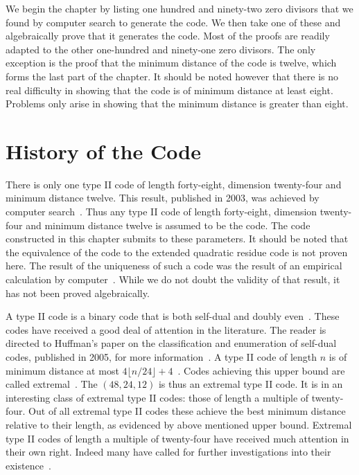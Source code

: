 We begin the chapter by listing one hundred and ninety-two zero divisors that we found by computer search to generate the code.
We then take one of these and algebraically prove that it generates the code.
Most of the proofs are readily adapted to the other one-hundred and ninety-one zero divisors.
The only exception is the proof that the minimum distance of the code is twelve, which forms the last part of the chapter.
It should be noted however that there is no real difficulty in showing that the code is of minimum distance at least eight.
Problems only arise in showing that the minimum distance is greater than eight.

\section{History of the Code}
There is only one type II code of length forty-eight, dimension twenty-four and minimum distance twelve.
This result, published in 2003, was achieved by computer search~\cite{hou02}.
Thus any type II code of length forty-eight, dimension twenty-four and minimum distance twelve is assumed to be the code.
The code constructed in this chapter submits to these parameters.
It should be noted that the equivalence of the code to the extended quadratic residue code is not proven here.
The result of the uniqueness of such a code was the result of an empirical calculation by computer~\cite{hou02}.
While we do not doubt the validity of that result, it has not been proved algebraically.

A type II code is a binary code that is both self-dual and doubly even~\cite[p.~339]{huf03}.
These codes have received a good deal of attention in the literature.
The reader is directed to Huffman's paper on the classification and enumeration of self-dual codes, published in 2005, for more information~\cite{huf05}.
A type II code of length $n$ is of minimum distance at most $4 \lfloor n / 24 \rfloor + 4$~\cite[p.~344]{huf03}.
Codes achieving this upper bound are called extremal~\cite[p.~346]{huf03}.
The $(48,24,12)$ is thus an extremal type II code.
It is in an interesting class of extremal type II codes: those of length a multiple of twenty-four.
Out of all extremal type II codes these achieve the best minimum distance relative to their length, as evidenced by above mentioned upper bound.
Extremal type II codes of length a multiple of twenty-four have received much attention in their own right.
Indeed many have called for further investigations into their existence~\cite{kim08}.

